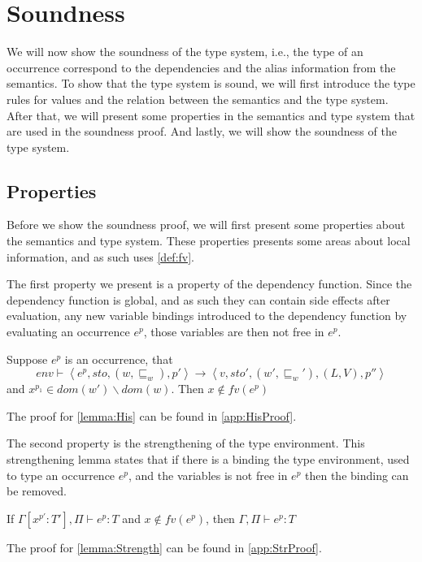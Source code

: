 \documentclass[../../master.tex]{subfiles}
\begin{document}
\section{Soundness}\label{sec:Soundness}
We will now show the soundness of the type system, i.e., the type of an occurrence correspond to the dependencies and the alias information from the semantics.
To show that the type system is sound, we will first introduce the type rules for values and the relation between the semantics and the type system.
After that, we will present some properties in the semantics and type system that are used in the soundness proof.
And lastly, we will show the soundness of the type system.




\subsection{Properties}
Before we show the soundness proof, we will first present some properties about the semantics and type system.
These properties presents some areas about local information, and as such uses \cref{def:fv}.

The first property we present is a property of the dependency function.
Since the dependency function is global, and as such they can contain side effects after evaluation, 
any new variable bindings introduced to the dependency function by evaluating an occurrence $e^p$, those variables are then not free in $e^p$.

\begin{lemma}[History]\label{lemma:His}
	Suppose $e^p$ is an occurrence, that
	$$env\vdash\left\langle e^{p},sto,(w,\sqsubseteq_w),p'\right\rangle\rightarrow\left\langle v,sto',(w',\sqsubseteq_w'),(L,V),p''\right\rangle$$
		and $x^{p_1}\in dom(w')\backslash dom(w)$.
		Then $x\notin fv(e^{p})$
\end{lemma}
The proof for \cref{lemma:His} can be found in \cref{app:HisProof}.

%

The second property is the strengthening of the type environment.
This strengthening lemma states that if there is a binding the type environment, used to type an occurrence $e^p$, and the variables is not free in $e^p$ then the binding can be removed.

\begin{lemma}[Strengthening]\label{lemma:Strength}
	If $\Gamma[x^{p'}:T'],\Pi\vdash e^{p}:T$ and $x\notin fv(e^p)$, then $\Gamma,\Pi\vdash e^{p}:T$
\end{lemma}
The proof for \cref{lemma:Strength} can be found in \cref{app:StrProof}.
%
\end{document}
